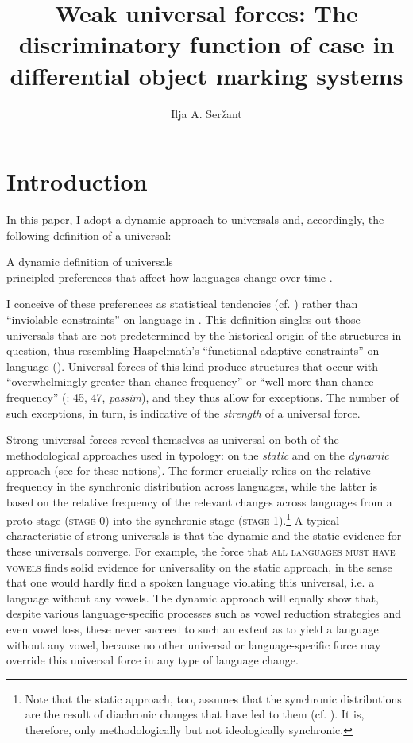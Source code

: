 \documentclass[output=paper]{langsci/langscibook}
\author{Ilja A. Seržant\affiliation{Leipzig University}}
\title{Weak universal forces: The discriminatory function of case in differential object marking systems}
\begin{document}
\maketitle 
 

\section{Introduction}

In this paper, I adopt a dynamic approach to universals \citep{Greenberg1978} and, accordingly, the following definition of a universal:

\ea\label{ex:serzant:1}
A dynamic definition of universals\\
principled preferences that affect how languages change over time \citep[401]{Bickel2011}.
\z

I conceive of these preferences as statistical tendencies (cf. \citealt{Bickel2011}) rather than “inviolable constraints” on language in \citet{Kiparsky2008}. This definition singles out those universals that are not predetermined by the historical origin of the structures in question, thus resembling Haspelmath’s “functional-adaptive constraints” on language (). Universal forces of this kind produce structures that occur with “overwhelmingly greater than chance frequency” or “well more than chance frequency” (\citealt{Greenberg1963}: 45, 47, \textit{passim}), and they thus allow for exceptions. The number of such exceptions, in turn, is indicative of the \textit{strength} of a universal force. 

Strong universal forces reveal themselves as universal on both of the methodological approaches used in typology: on the \textit{static} and on the \textit{dynamic} approach (see \citealt{Greenberg1969} for these notions). The former crucially relies on the relative frequency in the synchronic distribution across languages, while the latter is based on the relative frequency of the relevant changes across languages from a proto-stage (\textsc{stage} 0) into the synchronic stage (\textsc{stage} 1).\footnote{Note that the static approach, too, assumes that the synchronic distributions are the result of diachronic changes that have led to them (cf. ). It is, therefore, only methodologically but not ideologically synchronic.} A typical characteristic of strong universals is that the dynamic and the static evidence for these universals converge. For example, the force that \textsc{all languages must have vowels} \citep[19]{Comrie1989} finds solid evidence for universality on the static approach, in the sense that one would hardly find a spoken language violating this universal, i.e. a language without any vowels. The dynamic approach will equally show that, despite various language-specific processes such as vowel reduction strategies and even vowel loss, these never succeed to such an extent as to yield a language without any vowel, because no other universal or language-specific force may override this universal force in any type of language change.  
\end{document}

